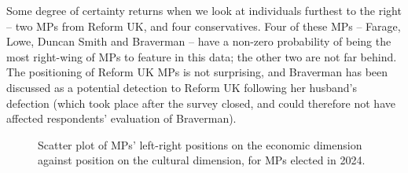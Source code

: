 \documentclass[
]{article}
\begin{document}
Some degree of certainty returns when we look at individuals furthest to
the right -- two MPs from Reform UK, and four conservatives. Four of
these MPs -- Farage, Lowe, Duncan Smith and Braverman -- have a non-zero
probability of being the most right-wing of MPs to feature in this data;
the other two are not far behind. The positioning of Reform UK MPs is
not surprising, and Braverman has been discussed as a potential
detection to Reform UK following her husband's defection (which took
place after the survey closed, and could therefore not have affected
respondents' evaluation of Braverman).

\begin{figure}


\caption{\label{fig-spcult}Scatter plot of MPs' left-right positions on
the economic dimension against position on the cultural dimension, for
MPs elected in 2024.}

\end{figure}%
\end{document}
